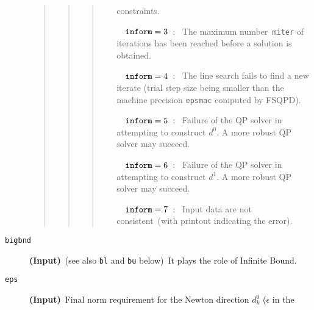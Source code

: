 \begin{description}
\begin{quote}
\begin{quote}
\begin{quote}
\begin{itemize}
                                                 constraints.
                  \item[~~${\tt inform} = 3$~:~] The maximum 
                                               number~{\tt miter} 
                                               of iterations has been 
                                               reached before a 
                                               solution is obtained.
                  \item[~~${\tt inform} = 4$~:~] The line search fails 
                                               to find a new 
                                               iterate (trial step size 
                                                being 
                                            smaller than the machine 
                                            precision 
                                        {\tt epsmac} computed by FSQPD).
                  \item[~~${\tt inform} = 5$~:~] Failure of the QP solver
                                                 in attempting 
                                                to construct $d^0$. A more
                                                robust QP solver may succeed.
                  \item[~~${\tt inform} = 6$~:~] Failure of the QP solver
                                                 in attempting 
                                               to construct $d^1$. A more
                                                robust QP solver may succeed.
                  \item[~~${\tt inform} = 7$~:~] Input data are not 
                                                consistent~(with 
                                                 printout
                                                indicating the error).
                   \end{itemize}
                   \end{quote}
                   \end{quote}
                   \end{quote}
\item[\tt bigbnd]  {\bf (Input)}~(see also {\tt bl} 
                  and {\tt bu} below)~It plays the role of 
                  Infinite Bound.
\item[\tt eps]    {\bf (Input)}~Final norm requirement for 
                  the Newton direction $d_k^0$ ($\epsilon$ in the 

\end{description}
